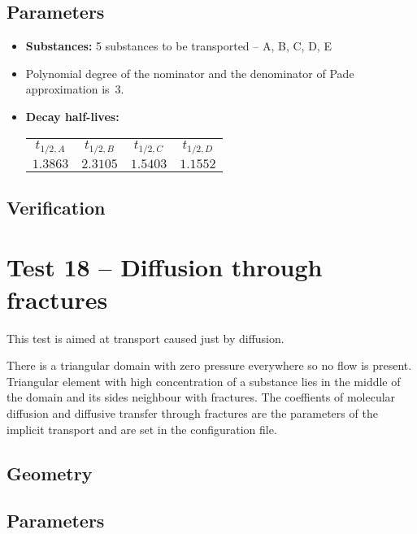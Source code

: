 \subsection*{Parameters}
\begin{itemize}
  \item \textbf{Substances:} 5 substances to be transported -- A, B, C, D, E
  \item Polynomial degree of the nominator and the denominator of Pade approximation is~3.
  \item \textbf{Decay half-lives:} 
    \begin{tabular}[c]{|c|c|c|c|}
      \hline
      $t_{1/2,A}$ & $t_{1/2,B}$  & $t_{1/2,C}$ & $t_{1/2,D}$\\[4pt]
      $1.3863$ & $2.3105$ & $1.5403$ & $1.1552$\\[4pt]
      \hline
    \end{tabular}
\end{itemize}

\subsection*{Verification}



\section{Test 18 -- Diffusion through fractures}
This test is aimed at transport caused just by diffusion. 

There is a triangular domain with zero pressure everywhere so no flow is present. Triangular element 
with high concentration of a substance lies in the middle of the domain and its sides neighbour with fractures.
The coeffients of molecular diffusion and diffusive transfer through fractures are the parameters of 
the implicit transport and are set in the configuration file.

\subsection*{Geometry}

\subsection*{Parameters}

